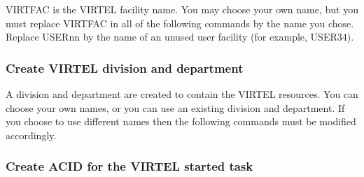 \documentclass[letterpaper,10pt,english]{sphinxmanual}
\begin{document}
\sphinxAtStartPar
{}

\sphinxAtStartPar
VIRTFAC is the VIRTEL facility name. You may choose your own name, but you must replace VIRTFAC in all of the following commands by the name you chose. Replace USERnn by the name of an unused user facility (for example, USER34).


\subsubsection{Create VIRTEL division and department}
\label{\detokenize{Installation_Guide:create-virtel-division-and-department}}
\begin{sphinxVerbatim}[commandchars=\\\{\}]
   
    
\end{sphinxVerbatim}

\sphinxAtStartPar
{}

\sphinxAtStartPar
A division and department are created to contain the VIRTEL resources. You can choose your own names, or you can use an existing division and department. If you choose to use different names then the following commands must be modified accordingly.


\subsubsection{Create ACID for the VIRTEL started task}
\label{\detokenize{Installation_Guide:create-acid-for-the-virtel-started-task}}
\begin{sphinxVerbatim}[commandchars=\\\{\}]
    
           
          
\end{sphinxVerbatim}
\end{document}
